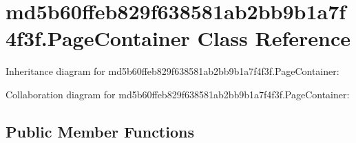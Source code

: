 \hypertarget{classmd5b60ffeb829f638581ab2bb9b1a7f4f3f_1_1_page_container}{}\section{md5b60ffeb829f638581ab2bb9b1a7f4f3f.\+Page\+Container Class Reference}
\label{classmd5b60ffeb829f638581ab2bb9b1a7f4f3f_1_1_page_container}


Inheritance diagram for md5b60ffeb829f638581ab2bb9b1a7f4f3f.\+Page\+Container\+:


Collaboration diagram for md5b60ffeb829f638581ab2bb9b1a7f4f3f.\+Page\+Container\+:
\subsection*{Public Member Functions}
